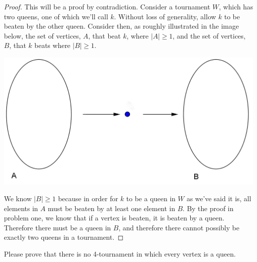 \documentclass[12pt]{article}
\newenvironment{problem}[2][Problem]{\begin{trivlist}
\item[\hskip \labelsep {\bfseries #1}\hskip \labelsep {\bfseries #2.}]}{\end{trivlist}}
\begin{document}
\begin{proof}
This will be a proof by contradiction. Consider a tournament $W$, which has two queens, one of which we'll call $k$. Without loss of generality, allow $k$ to be beaten by the other queen. Consider then, as roughly illustrated in the image below, the set of vertices, $A$, that beat $k$, where $|A|\geq1$, and the set of vertices, $B$, that $k$ beats where $|B|\geq1$.
\begin{center}
\includegraphics[scale=0.8]{Prob_1.png}
\end{center}
 We know $|B|\geq1$ because in order for $k$ to be a queen in $W$ as we've said it is, all elements in $A$ must be beaten by at least one element in $B$. By the proof in problem one, we know that if a vertex is beaten, it is beaten by a queen. Therefore there must be a queen in $B$, and therefore there cannot possibly be exactly two queens in a tournament.
\end{proof}

\begin{problem}{3}
Please prove that there is no 4-tournament in which every vertex is a queen.
\end{problem}
 
\end{document}
